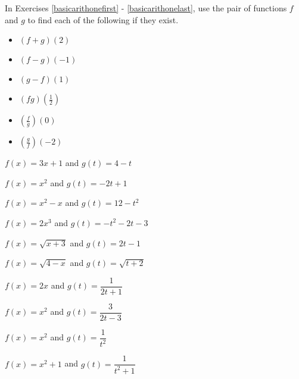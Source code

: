 \documentclass{ximera}
\begin{document}
	\author{Stitz-Zeager}



\label{ExercisesforFunctionArithmetic}

\begin{question}
    
In Exercises \ref{basicarithonefirst} - \ref{basicarithonelast}, use the pair of functions $f$ and $g$ to find each of the following  if they exist.


\begin{itemize}
\item  $(f+g)(2)$ 
\item  $(f-g)(-1)$
\item  $(g-f)(1)$
\item  $(fg)\left(\frac{1}{2}\right)$
\item  $\left(\frac{f}{g}\right)(0)$
\item  $\left(\frac{g}{f}\right)\left(-2\right)$
\end{itemize}

\begin{problem}\label{basicarithonefirst}
$f(x) = 3x+1$ and  $g(t) = 4-t$ 
\end{problem}

\begin{problem}
$f(x) = x^2$ and $g(t) = -2t+1$
\end{problem}

\begin{problem}
$f(x) = x^2 - x$ and  $g(t) = 12-t^2$
\end{problem}

\begin{problem}
$f(x) = 2x^3$ and $g(t) = -t^2-2t-3$
\end{problem}

\begin{problem}
$f(x) = \sqrt{x+3}$ and  $g(t) = 2t-1$
\end{problem}

\begin{problem}
$f(x) = \sqrt{4-x}$ and $g(t) = \sqrt{t+2}$
\end{problem}

\begin{problem}
$f(x) = 2x$ and  $g(t) = \dfrac{1}{2t+1}$
\end{problem} 

\begin{problem}
$f(x) = x^2$ and $g(t) = \dfrac{3}{2t-3}$
\end{problem}   

\begin{problem}
$f(x) = x^2$ and  $g(t) = \dfrac{1}{t^2}$
\end{problem} 

\begin{problem}\label{basicarithonelast}
$f(x) = x^2+1$ and $g(t) = \dfrac{1}{t^2+1}$
\end{problem}   

\end{question}
\end{document}
